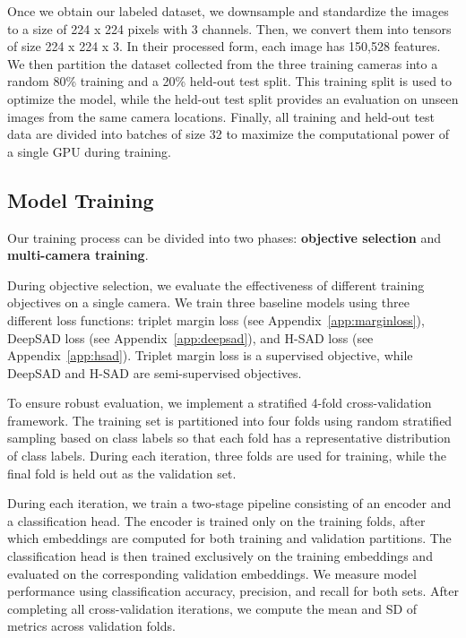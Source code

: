 \documentclass{article}
\begin{document}
Once we obtain our labeled dataset, we downsample and standardize the images to a size of 224 x 224 pixels with 3 channels. Then, we convert them into tensors of size 224 x 224 x 3. In their processed form, each image has 150,528 features.  We then partition the dataset collected from the three training cameras into a random 80\% training and a 20\% held-out test split. This training split is used to optimize the model, while the held-out test split provides an evaluation on unseen images from the same camera locations. Finally, all training and held-out test data are divided into batches of size 32 to maximize the computational power of a single \ac{GPU} during training. 

\subsection{Model Training}

Our training process can be divided into two phases: \textbf{objective selection} and \textbf{multi-camera training}. 

During objective selection, we evaluate the effectiveness of different training objectives on a single camera. We train three baseline models using three different loss functions: triplet margin loss (see Appendix~\ref{app:marginloss}), \ac{DeepSAD} loss (see Appendix~\ref{app:deepsad}), and \ac{H-SAD} loss (see Appendix~\ref{app:hsad}). Triplet margin loss is a supervised objective, while \ac{DeepSAD} and \ac{H-SAD} are semi-supervised objectives. 

To ensure robust evaluation, we implement a stratified 4-fold cross-validation framework. The training set is partitioned into four folds using random stratified sampling based on class labels so that each fold has a representative distribution of class labels. During each iteration, three folds are used for training, while the final fold is held out as the validation set. 

During each iteration, we train a two-stage pipeline consisting of an encoder and a classification head. The encoder is trained only on the training folds, after which embeddings are computed for both training and validation partitions. The classification head is then trained exclusively on the training embeddings and evaluated on the corresponding validation embeddings. We measure model performance using classification accuracy, precision, and recall for both sets. After completing all cross-validation iterations, we compute the mean and \ac{SD} of metrics across validation folds. 
\end{document}
